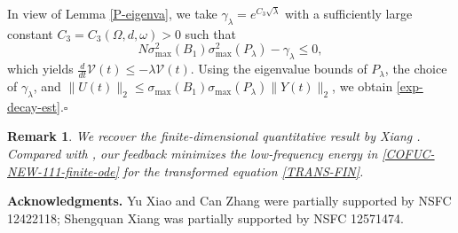 \documentclass[a4paper]{article}
\newtheorem{remark}[theorem]{Remark}
\numberwithin{equation}{section}
\begin{document}
In view of Lemma \ref{P-eigenva}, we take $\gamma_\lambda=e^{C_3\sqrt{\lambda}}$ with a sufficiently large constant $C_3=C_3(\Omega,d,\omega)>0$ such that
$$N\sigma_{\max}^2(B_1)\sigma_{\max}^2(P_\lambda)-\gamma_\lambda\le0,$$
which yields $\frac{d}{dt}\mathcal V(t)\le -\lambda \mathcal V(t)$. Using the eigenvalue bounds of $P_\lambda$, the choice of $\gamma_\lambda$, and $\|U(t)\|_2\le \sigma_{\max}(B_1)\sigma_{\max}(P_\lambda)\|Y(t)\|_2$, we obtain \eqref{exp-decay-est}.\hfill$\square$

\begin{remark}
We recover the finite-dimensional quantitative result by Xiang \cite{X2}. Compared with \cite{X2}, our feedback minimizes the low-frequency energy in \eqref{COFUC-NEW-111-finite-ode} for the transformed equation \eqref{TRANS-FIN}.
\end{remark}

\noindent \textbf{Acknowledgments.} Yu Xiao and Can Zhang were partially supported by NSFC 12422118; Shengquan Xiang was partially supported by NSFC 12571474.

  

\end{document}
